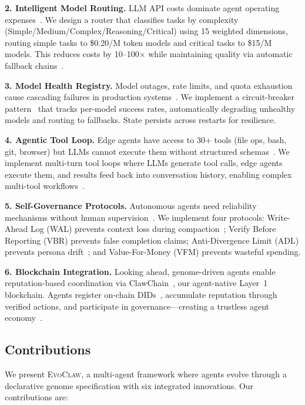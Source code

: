 \documentclass{article}
\newcommand{\evoclaw}{\textsc{EvoClaw}}
\begin{document}
\textbf{2. Intelligent Model Routing.} LLM API costs dominate agent operating expenses~\cite{liu2023llm}. We design a router that classifies tasks by complexity (Simple/Medium/Complex/Reasoning/Critical) using 15 weighted dimensions, routing simple tasks to \$0.20/M token models and critical tasks to \$15/M models. This reduces costs by 10--100$\times$ while maintaining quality via automatic fallback chains~\cite{frugal}.

\textbf{3. Model Health Registry.} Model outages, rate limits, and quota exhaustion cause cascading failures in production systems~\cite{tan2020head}. We implement a circuit-breaker pattern~\cite{ford2000circuit} that tracks per-model success rates, automatically degrading unhealthy models and routing to fallbacks. State persists across restarts for resilience.

\textbf{4. Agentic Tool Loop.} Edge agents have access to 30+ tools (file ops, bash, git, browser) but LLMs cannot execute them without structured schemas~\cite{schick2023toolformer}. We implement multi-turn tool loops where LLMs generate tool calls, edge agents execute them, and results feed back into conversation history, enabling complex multi-tool workflows~\cite{parisi2023gorilla}.

\textbf{5. Self-Governance Protocols.} Autonomous agents need reliability mechanisms without human supervision~\cite{shinn2024reflexion}. We implement four protocols: Write-Ahead Log (WAL) prevents context loss during compaction~\cite{hewitt1976implementation}; Verify Before Reporting (VBR) prevents false completion claims; Anti-Divergence Limit (ADL) prevents persona drift~\cite{park2023generative}; and Value-For-Money (VFM) prevents wasteful spending.

\textbf{6. Blockchain Integration.} Looking ahead, genome-driven agents enable reputation-based coordination via ClawChain~\cite{clawchain}, our agent-native Layer~1 blockchain. Agents register on-chain DIDs~\cite{spencer2015decentralized}, accumulate reputation through verified actions, and participate in governance---creating a trustless agent economy~\cite{buterin2014ethereum}.

\subsection{Contributions}

We present \evoclaw{}, a multi-agent framework where agents evolve through a declarative genome specification with six integrated innovations. Our contributions are:
\end{document}
